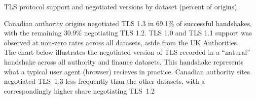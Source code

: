\documentclass[conference]{IEEEtran}
\begin{document}
\begin{table}[t]
  \caption{TLS protocol support and negotiated versions by dataset (percent of origins).}
  \label{tab:tls_summary}
  \centering
  \scriptsize
  \setlength{\tabcolsep}{3pt}
  \renewcommand{\arraystretch}{1.15}
  
  \begin{adjustbox}{max width=\columnwidth}
  \end{adjustbox}
\end{table}

Canadian authority origins negotiated TLS 1.3 in 69.1\% of successful handshakes, with the remaining 30.9\% negotiating TLS 1.2.
TLS 1.0 and TLS 1.1 support was observed at non-zero rates across all datasets, aside from the UK Authorities. The chart below illustrates the 
negotiated version of TLS recorded in a ``natural'' handshake across all authority and finance datasets. This handshake 
represents what a typical user agent (browser) recieves in practice. Canadian authority sites 
negotiated TLS~1.3 less frequently than the other datasets, with a correspondingly higher share negotiating TLS~1.2
\end{document}
